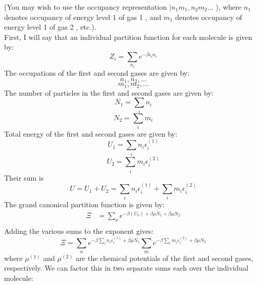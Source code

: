 \documentclass[12pt]{article}
\begin{document}
(You may wish to use the occupancy representation $\mid n_{1} m_{1}, n_{2} m_{2} \ldots$ ), where $n_{1}$ denotes occupancy of energy level 1 of gas 1 , and $m_{1}$ denotes occupancy of energy level 1 of gas 2 , etc.).\\
First, I will say that an individual partition function for each molecule is given by:
\begin{equation}
  Z_i = \sum_{n_i} e^{-\beta \epsilon_i n_i}
\end{equation}
The occupations of the first and second gases are given by:
\begin{equation}
  n_1, n_2,...
\end{equation}
\begin{equation}
  m_1, m_2,...
\end{equation}
The number of particles in the first and second gases are given by:
\begin{equation}
  N_1 = \sum_{i} n_i
\end{equation}
\begin{equation}
  N_2 = \sum_{i} m_i
\end{equation}
Total energy of the first and second gases are given by:
\begin{equation}
  U_1 = \sum_{i} n_i \epsilon_i^{(1)}
\end{equation}
\begin{equation}
  U_2 = \sum_{i} m_i \epsilon_i^{(2)}
\end{equation}
Their sum is
\begin{equation}
  U = U_1 + U_2 = \sum_{i} n_i \epsilon_i^{(1)} + \sum_{i} m_i \epsilon_i^{(2)}
\end{equation}
The grand canonical partition function is given by:
\begin{equation}
  \begin{aligned}
    \Xi &= \sum_{\nu} e^{-\beta(U_{\nu}) +  \beta \mu N_{1} + \beta \mu N_{2}} \\
\end{aligned}
\end{equation}
Adding the various sums to the exponent gives:
\begin{equation}
  \Xi = \sum_{{n}} e^{-\beta \sum_{i} n_i \epsilon_i^{(1)} +  \beta \mu N_{1}} \sum_{{m}}e^{-\beta \sum_{i} m_i \epsilon_i^{(2)} +  \beta \mu N_{2}}
\end{equation}
where $\mu^{(1)}$ and $\mu^{(2)}$ are the chemical potentials of the first and second gases, respectively. We can factor this in two separate sums each over the individual molecule:
\end{document}
